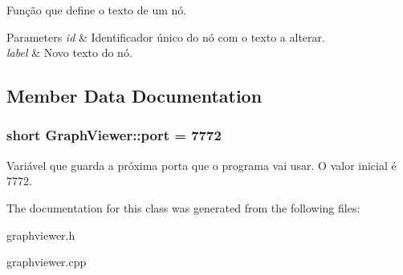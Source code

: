 Função que define o texto de um nó. 
\begin{DoxyParams}{Parameters}
{\em id} & Identificador único do nó com o texto a alterar. \\
\hline
{\em label} & Novo texto do nó. \\
\hline
\end{DoxyParams}


\subsection{Member Data Documentation}
\hypertarget{class_graph_viewer_a89d0abe75f41feededc49497cc514342}{
\subsubsection[{port}]{\setlength{\rightskip}{0pt plus 5cm}short Graph\-Viewer\-::port = 7772\hspace{0.3cm}{\ttfamily [static]}}}\label{class_graph_viewer_a89d0abe75f41feededc49497cc514342}
Variável que guarda a próxima porta que o programa vai usar. O valor inicial é 7772. 

The documentation for this class was generated from the following files\-:\begin{DoxyCompactItemize}
\item 
graphviewer.\-h\item 
graphviewer.\-cpp\end{DoxyCompactItemize}
